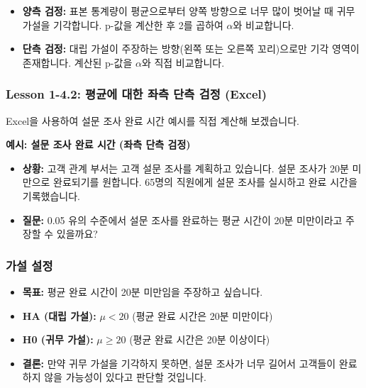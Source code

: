 \documentclass[11pt,a4paper]{book}
\theoremstyle{definition}
\begin{document}
\begin{itemize}
    \item \textbf{양측 검정:} 표본 통계량이 평균으로부터 양쪽 방향으로 너무 많이 벗어날 때 귀무 가설을 기각합니다. p-값을 계산한 후 2를 곱하여 $\alpha$와 비교합니다.
    \item \textbf{단측 검정:} 대립 가설이 주장하는 방향(왼쪽 또는 오른쪽 꼬리)으로만 기각 영역이 존재합니다. 계산된 p-값을 $\alpha$와 직접 비교합니다.
\end{itemize}


\subsubsection{Lesson 1-4.2: 평균에 대한 좌측 단측 검정 (Excel)}

Excel을 사용하여 설문 조사 완료 시간 예시를 직접 계산해 보겠습니다.

\begin{examplebox}
\textbf{예시: 설문 조사 완료 시간 (좌측 단측 검정)}
\begin{itemize}
    \item \textbf{상황:} 고객 관계 부서는 고객 설문 조사를 계획하고 있습니다. 설문 조사가 20분 미만으로 완료되기를 원합니다. 65명의 직원에게 설문 조사를 실시하고 완료 시간을 기록했습니다.
    \item \textbf{질문:} 0.05 유의 수준에서 설문 조사를 완료하는 평균 시간이 20분 미만이라고 주장할 수 있을까요?
\end{itemize}
\end{examplebox}

\subsubsection*{가설 설정}

\begin{itemize}
    \item \textbf{목표:} 평균 완료 시간이 20분 미만임을 주장하고 싶습니다.
    \item \textbf{HA (대립 가설):} $\mu < 20$ (평균 완료 시간은 20분 미만이다)
    \item \textbf{H0 (귀무 가설):} $\mu \ge 20$ (평균 완료 시간은 20분 이상이다)
    \item \textbf{결론:} 만약 귀무 가설을 기각하지 못하면, 설문 조사가 너무 길어서 고객들이 완료하지 않을 가능성이 있다고 판단할 것입니다.
\end{itemize}
\end{document}
